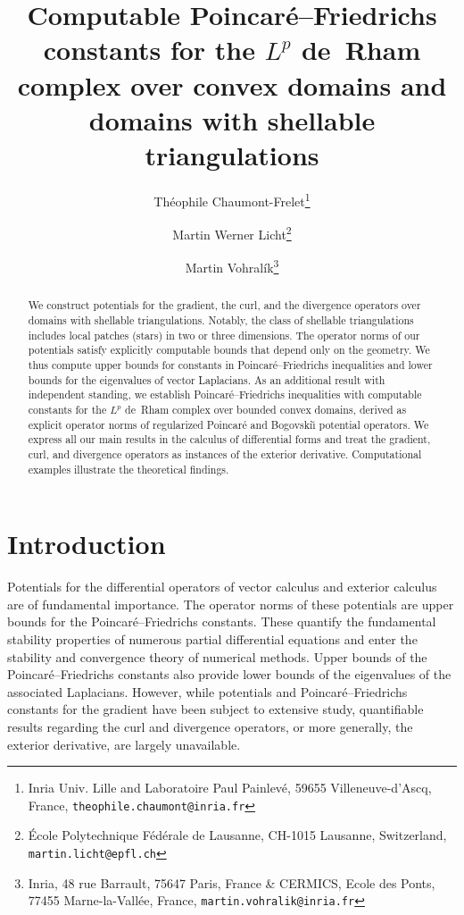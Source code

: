 \documentclass[10pt,a4paper]{article}
\title{Computable Poincar\'e--Friedrichs constants for the $L^{p}$ de~Rham complex over convex domains and domains with shellable triangulations}
\author{
    Th\'eophile Chaumont-Frelet\thanks{Inria Univ. Lille and Laboratoire Paul Painlev\'e, 59655 Villeneuve-d'Ascq, France, \texttt{theophile.chaumont@inria.fr}} \and
    Martin Werner Licht\thanks{\'Ecole Polytechnique F\'ed\'erale de Lausanne, CH-1015 Lausanne, Switzerland, \texttt{martin.licht@epfl.ch}} \and
    Martin Vohral\'ik\thanks{Inria, 48 rue Barrault, 75647 Paris, France \& CERMICS, Ecole des Ponts, 77455 Marne-la-Vall\'ee, France, \texttt{martin.vohralik@inria.fr}}
}
\date{}
\begin{document}
\maketitle

\begin{abstract}
    We construct potentials for the gradient, the curl, and the divergence operators over domains with shellable triangulations.
    Notably, the class of shellable triangulations includes local patches (stars) in two or three dimensions.
    The operator norms of our potentials satisfy explicitly computable bounds that depend only on the geometry.
    We thus compute upper bounds for constants in Poincar\'e--Friedrichs inequalities and lower bounds for the eigenvalues of vector Laplacians.
    As an additional result with independent standing, we establish Poincar\'e--Friedrichs inequalities with computable constants for the $L^{p}$ de~Rham complex over bounded convex domains, derived as explicit operator norms of regularized Poincar\'e and Bogovski\u{\i} potential operators.
    We express all our main results in the calculus of differential forms and treat the gradient, curl, and divergence operators as instances of the exterior derivative.
    Computational examples illustrate the theoretical findings.
\end{abstract}


 



\section{Introduction}\label{section:intro}

Potentials for the differential operators of vector calculus and exterior calculus are of fundamental importance.
The operator norms of these potentials are upper bounds for the Poincar\'e--Friedrichs constants.
These quantify the fundamental stability properties of {numerous} partial differential equations %
and enter the stability and convergence theory of numerical methods.
Upper bounds of the Poincar\'e--Friedrichs constants also provide lower bounds of the eigenvalues of the associated Laplacians.
However, while potentials and Poincar\'e--Friedrichs constants for the gradient have been subject to extensive study,
quantifiable results regarding the curl and divergence operators, or more generally, the exterior derivative, are largely unavailable.
\end{document}
